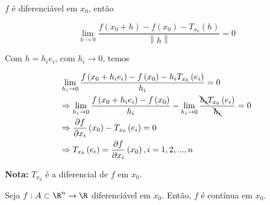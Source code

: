 \documentclass{book}
\begin{document}
\begin{dem}
$f$ \'e diferenci\'avel em $x_0$, ent\~ao

\[
    \mathop {\lim }\limits_{h \to 0} \frac{{f\left( {x_0  + h} \right) - f\left( {x_0 } \right) - T_{x_0 } \left( h \right)}}{{\left\| h \right\|}} = 0
\]

Com $h = h_i e_i$, com $h_i \to 0$, temos

\[
\begin{gathered}
  \mathop {\lim }\limits_{h_i  \to 0} \frac{{f\left( {x_0  + h_i e_i } \right) - f\left( {x_0 } \right) - h_i T_{x_0 } \left( {e_i } \right)}}
{{h_i }} = 0 \hfill \\
   \Rightarrow \mathop {\lim }\limits_{h_i  \to 0} \frac{{f\left( {x_0  + h_i e_i } \right) - f\left( {x_0 } \right)}}
{{h_i }} - \mathop {\lim }\limits_{h_i  \to 0} \frac{{\bcancel{h_i} T_{x_0 } \left( {e_i } \right)}}{{\bcancel{h_i} }} = 0 \hfill \\
\Rightarrow \frac{{\partial f}}
{{\partial x_i }}\left( {x_0 } \right) - T_{x_0 } \left( {e_i } \right) = 0 \hfill \\
\Rightarrow T_{x_0 } \left( {e_i } \right) = \frac{{\partial f}}
{{\partial x_i }}\left( {x_0 } \right),i = 1,2,...,n \hfill \\
\end{gathered}
\]

\end{dem}

\textbf{Nota:} $T_{x_0 }$ \'e a diferencial de $f$ em $x_0$.

\begin{teo}
    Seja $f:A \subset \R^n \to \R$ diferenci\'avel em $x_0$. Ent\~ao, $f$ \'e cont\'inua em $x_0$.
\end{teo}
\end{document}
